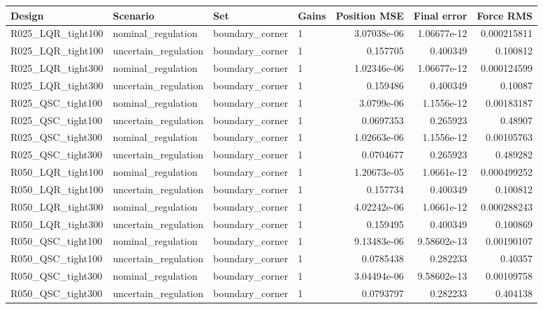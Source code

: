 \begin{tabular}{llllrrr}
\hline
Design & Scenario & Set & Gains & Position MSE & Final error & Force RMS \\
\hline
R025\_LQR\_tight100 & nominal\_regulation & boundary\_corner & 1 & 3.07038e-06 & 1.06677e-12 & 0.000215811 \\
R025\_LQR\_tight100 & uncertain\_regulation & boundary\_corner & 1 & 0.157705 & 0.400349 & 0.100812 \\
R025\_LQR\_tight300 & nominal\_regulation & boundary\_corner & 1 & 1.02346e-06 & 1.06677e-12 & 0.000124599 \\
R025\_LQR\_tight300 & uncertain\_regulation & boundary\_corner & 1 & 0.159486 & 0.400349 & 0.10087 \\
R025\_QSC\_tight100 & nominal\_regulation & boundary\_corner & 1 & 3.0799e-06 & 1.1556e-12 & 0.00183187 \\
R025\_QSC\_tight100 & uncertain\_regulation & boundary\_corner & 1 & 0.0697353 & 0.265923 & 0.48907 \\
R025\_QSC\_tight300 & nominal\_regulation & boundary\_corner & 1 & 1.02663e-06 & 1.1556e-12 & 0.00105763 \\
R025\_QSC\_tight300 & uncertain\_regulation & boundary\_corner & 1 & 0.0704677 & 0.265923 & 0.489282 \\
R050\_LQR\_tight100 & nominal\_regulation & boundary\_corner & 1 & 1.20673e-05 & 1.0661e-12 & 0.000499252 \\
R050\_LQR\_tight100 & uncertain\_regulation & boundary\_corner & 1 & 0.157734 & 0.400349 & 0.100812 \\
R050\_LQR\_tight300 & nominal\_regulation & boundary\_corner & 1 & 4.02242e-06 & 1.0661e-12 & 0.000288243 \\
R050\_LQR\_tight300 & uncertain\_regulation & boundary\_corner & 1 & 0.159495 & 0.400349 & 0.100869 \\
R050\_QSC\_tight100 & nominal\_regulation & boundary\_corner & 1 & 9.13483e-06 & 9.58602e-13 & 0.00190107 \\
R050\_QSC\_tight100 & uncertain\_regulation & boundary\_corner & 1 & 0.0785438 & 0.282233 & 0.40357 \\
R050\_QSC\_tight300 & nominal\_regulation & boundary\_corner & 1 & 3.04494e-06 & 9.58602e-13 & 0.00109758 \\
R050\_QSC\_tight300 & uncertain\_regulation & boundary\_corner & 1 & 0.0793797 & 0.282233 & 0.404138 \\

\end{tabular}
